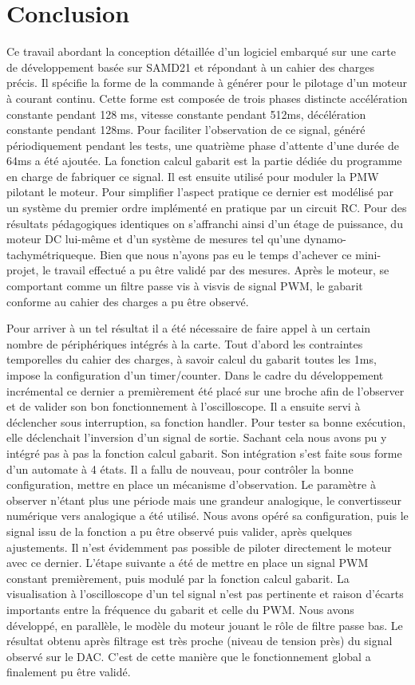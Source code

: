 \documentclass[a4paper]{article}
\begin{document}
\newpage

\section{Conclusion}
Ce travail abordant la conception détaillée d'un logiciel embarqué sur une carte de développement basée sur SAMD21 et répondant à un cahier des charges précis. Il spécifie la forme de la commande à générer pour le pilotage d'un moteur à courant continu. Cette forme est composée de trois phases distincte accélération constante pendant 128 ms, vitesse constante pendant 512ms, décélération constante pendant 128ms. Pour faciliter l'observation de ce signal, généré périodiquement pendant les tests, une quatrième phase d'attente d'une durée de 64ms a été ajoutée. La fonction calcul gabarit est la partie dédiée du programme en charge de fabriquer ce signal. Il est ensuite utilisé pour moduler la PMW pilotant le moteur. Pour simplifier l'aspect pratique ce dernier est modélisé par un système du premier ordre implémenté en pratique par un circuit RC. Pour des résultats pédagogiques identiques on s'affranchi ainsi d'un étage de puissance, du moteur DC lui-même et d'un système de mesures tel qu'une dynamo-tachymétriqueque. Bien que nous n'ayons pas eu le temps d'achever ce mini-projet, le travail effectué a pu être validé par des mesures. Après le moteur, se comportant comme un filtre passe vis à visvis de signal PWM, le gabarit conforme au cahier des charges a pu être observé.


Pour arriver à un tel résultat il a été nécessaire de faire appel à un certain nombre de périphériques intégrés à la carte. Tout d'abord les contraintes temporelles du cahier des charges, à savoir calcul du gabarit toutes les 1ms, impose la configuration d'un timer/counter. Dans le cadre du développement incrémental ce dernier a premièrement été placé sur une broche afin de l'observer et de valider son bon fonctionnement à l'oscilloscope. Il a ensuite servi à déclencher sous interruption, sa fonction handler. Pour tester sa bonne exécution, elle déclenchait l'inversion d'un signal de sortie. Sachant cela nous avons pu y intégré pas à pas la fonction calcul gabarit. Son intégration s'est faite sous forme d'un automate à 4 états. Il a fallu de nouveau, pour contrôler la bonne configuration, mettre en place un mécanisme d'observation. Le paramètre à observer n'étant plus une période mais une grandeur analogique, le convertisseur numérique vers analogique a été utilisé. Nous avons opéré sa configuration, puis le signal issu de la fonction a pu être observé puis valider, après quelques ajustements. Il n'est évidemment pas possible de piloter directement le moteur avec ce dernier. L'étape suivante a été de mettre en place un signal PWM constant premièrement, puis modulé par la fonction calcul gabarit. La visualisation à l'oscilloscope d'un tel signal n'est pas pertinente et raison d'écarts importants entre la fréquence du gabarit et celle du PWM. Nous avons développé, en parallèle, le modèle du moteur jouant le rôle de filtre passe bas. Le résultat obtenu après filtrage est très proche (niveau de tension près) du signal observé sur le DAC. C'est de cette manière que le fonctionnement global a finalement pu être validé.
\end{document}
